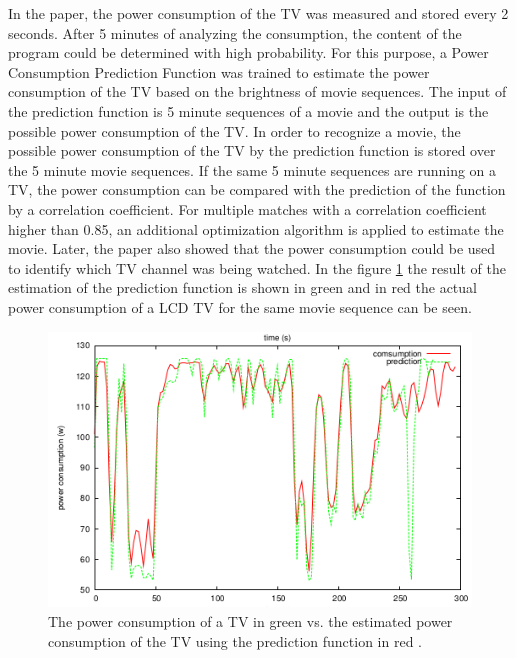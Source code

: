 In the paper, the power consumption of the TV was measured and stored every 2 seconds. After 5 minutes of analyzing the consumption, the content of the program could be determined with high probability. For this purpose, a Power Consumption Prediction Function was trained to estimate the power consumption of the TV based on the brightness of movie sequences. 
The input of the prediction function is 5 minute sequences of a movie and the output is the possible power consumption of the TV. 
In order to recognize a movie, the possible power consumption of the TV by the prediction function is stored over the 5 minute movie sequences. If the same 5 minute sequences are running on a TV, the power consumption can be compared with the prediction of the function by a correlation coefficient. For multiple matches with a correlation coefficient higher than 0.85, an additional optimization algorithm is applied to estimate the movie. Later, the paper also showed that the power consumption could be used to identify which TV channel was being watched. In the figure \ref{fig:tv} the result of the estimation of the prediction function is shown in green and in red the actual power consumption of a LCD TV for the same movie sequence can be seen. 
\begin{figure}[tbp]
  \centering
  \includegraphics[width=1\textwidth]{images/Fernseher.png}
  \caption[Estimated power consumption of a TV]{The power consumption of a TV in green vs. the estimated power consumption of the TV using the prediction function in red \cite{greveler2012multimedia}.}
  \label{fig:tv}
\end{figure}
